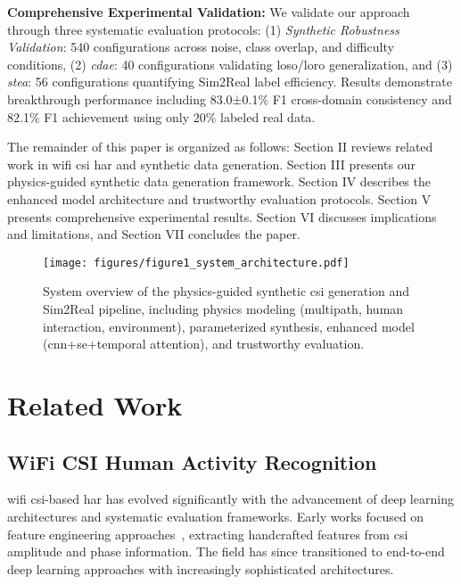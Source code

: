 \documentclass[journal]{IEEEtran}
\begin{document}
\textbf{Comprehensive Experimental Validation:} We validate our approach through three systematic evaluation protocols: (1) \textit{Synthetic Robustness Validation}: 540 configurations across noise, class overlap, and difficulty conditions, (2) \textit{\gls{cdae}}: 40 configurations validating \gls{loso}/\gls{loro} generalization, and (3) \textit{\gls{stea}}: 56 configurations quantifying Sim2Real label efficiency. Results demonstrate breakthrough performance including 83.0±0.1\% F1 cross-domain consistency and 82.1\% F1 achievement using only 20\% labeled real data.

The remainder of this paper is organized as follows: Section II reviews related work in \gls{wifi} \gls{csi} \gls{har} and synthetic data generation. Section III presents our physics-guided synthetic data generation framework. Section IV describes the enhanced model architecture and trustworthy evaluation protocols. Section V presents comprehensive experimental results. Section VI discusses implications and limitations, and Section VII concludes the paper.

\begin{figure}[t]
\centering
\texttt{[image: figures/figure1\_system\_architecture.pdf]}
\caption{System overview of the physics-guided synthetic \gls{csi} generation and Sim2Real pipeline, including physics modeling (multipath, human interaction, environment), parameterized synthesis, enhanced model (\gls{cnn}+\gls{se}+temporal attention), and trustworthy evaluation.}
\label{fig:system_overview}
\end{figure}


\section{Related Work}

\subsection{WiFi CSI Human Activity Recognition}

\gls{wifi} \gls{csi}-based \gls{har} has evolved significantly with the advancement of deep learning architectures and systematic evaluation frameworks. Early works focused on feature engineering approaches~\cite{csi_basics2016}, extracting handcrafted features from \gls{csi} amplitude and phase information. The field has since transitioned to end-to-end deep learning approaches with increasingly sophisticated architectures.
\end{document}
